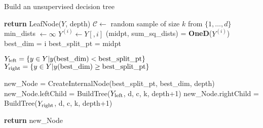 \begin{algorithm}
\caption{Build an unsupervised decision tree}
\label{alg:buildBICtree}
\begin{algorithmic}[1]
	\State \textbf{return} LeafNode($Y$, depth)
\Else
	\State $\mathcal{C} \leftarrow $ random sample of size $k$ from $\lbrace 1, \dots , d \rbrace $ 
	\State min\_dists $ \leftarrow \infty$ 
		\State $Y^{(i)} \leftarrow  Y \left[ , i  \right] $
		\State (midpt, sum\_sq\_dists) = \textbf{OneD}($Y^{(i)}$) 
			\State best\_dim = i
			\State best\_split\_pt = midpt
		\EndIf
	\EndFor
		
	\State $Y_{\textnormal{left}} = \lbrace y \in Y |  y( \textnormal{best\_dim} )  <  \textnormal{best\_split\_pt} \rbrace$
	\State $Y_{\textnormal{right}} = \lbrace y \in Y |   y(\textnormal{best\_dim})  \geq \textnormal{best\_split\_pt} \rbrace$

	\State new\_Node = CreateInternalNode(best\_split\_pt, best\_dim, depth)
	\State new\_Node.leftChild = BuildTree($Y_{\textnormal{left}}$,  d, c, k, depth+1)
	\State new\_Node.rightChild = BuildTree($Y_{\textnormal{right}}$,  d, c, k, depth+1)
	 
	\State \textbf{return} new\_Node

\EndIf
\EndProcedure
\end{algorithmic}
\end{algorithm}

